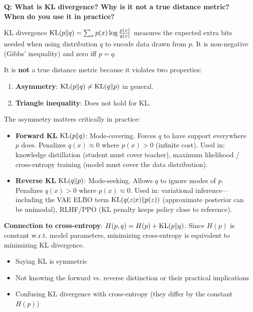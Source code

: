 \begin{interviewq}
\textbf{Q: What is KL divergence? Why is it not a true distance metric? When do you use it in practice?}

 \quad {} \quad \badgefreq{\freqhigh}

\stronganswer
KL divergence $\operatorname{KL}(p \| q) = \sum_x p(x) \log \frac{p(x)}{q(x)}$ measures the expected extra bits needed when using distribution $q$ to encode data drawn from $p$. It is non-negative (Gibbs' inequality) and zero iff $p = q$.

It is \textbf{not} a true distance metric because it violates two properties:
\begin{enumerate}
    \item \textbf{Asymmetry}: $\operatorname{KL}(p \| q) \neq \operatorname{KL}(q \| p)$ in general.
    \item \textbf{Triangle inequality}: Does not hold for KL.
\end{enumerate}

The asymmetry matters critically in practice:
\begin{itemize}
    \item \textbf{Forward KL} $\operatorname{KL}(p \| q)$: Mode-covering. Forces $q$ to have support everywhere $p$ does. Penalizes $q(x) \approx 0$ where $p(x) > 0$ (infinite cost). Used in: knowledge distillation (student must cover teacher), maximum likelihood / cross-entropy training (model must cover the data distribution).
    \item \textbf{Reverse KL} $\operatorname{KL}(q \| p)$: Mode-seeking. Allows $q$ to ignore modes of $p$. Penalizes $q(x) > 0$ where $p(x) \approx 0$. Used in: variational inference---including the VAE ELBO term $\operatorname{KL}(q(z|x) \| p(z))$ (approximate posterior can be unimodal), RLHF/PPO (KL penalty keeps policy close to reference).
\end{itemize}

\textbf{Connection to cross-entropy}: $H(p, q) = H(p) + \operatorname{KL}(p \| q)$. Since $H(p)$ is constant w.r.t. model parameters, minimizing cross-entropy is equivalent to minimizing KL divergence.

\redflags
\begin{itemize}
    \item Saying KL is symmetric
    \item Not knowing the forward vs. reverse distinction or their practical implications
    \item Confusing KL divergence with cross-entropy (they differ by the constant $H(p)$)
\end{itemize}


\end{interviewq}
